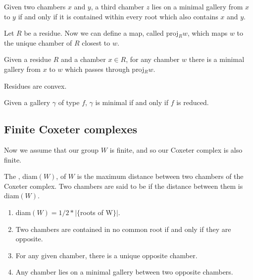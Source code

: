 \documentclass[11pt]{article}
\begin{document}
\begin{proposition}
    Given two chambers $x$ and $y$, a third chamber $z$ lies on a minimal gallery from $x$ to $y$ if and only if it is contained within every root which also contains $x$ and $y$. 
\end{proposition}


Let $R$ be a residue. Now we can define a map, called proj$_Rw$, which maps $w$ to the unique chamber of $R$ closest to $w$. 


\begin{proposition}
    Given a residue $R$ and a chamber $x\in R$, for any chamber $w$ there is a minimal gallery from $x$ to $w$ which passes through proj$_Rw$. 
\end{proposition}

\begin{lemma}
    Residues are convex.
\end{lemma}

\begin{theorem}
    Given a gallery $\gamma$ of type $f$, $\gamma$ is minimal if and only if $f$ is reduced.
\end{theorem}


\subsection{Finite Coxeter complexes}

Now we assume that our group $W$ is finite, and so our Coxeter complex is also finite.

\begin{definition}
    The , diam$(W)$, of $W$ is the maximum distance between two chambers of the Coxeter complex. Two chambers are said to be  if the distance between them is diam$(W)$.
\end{definition}

\begin{theorem}
    \begin{enumerate}
        \item diam$(W) = 1/2\ast |\{${roots of W}$\}|$. 
        \item Two chambers are contained in no common root if and only if they are opposite.
        \item For any given chamber, there is a unique opposite chamber.
        \item Any chamber lies on a minimal gallery between two opposite chambers.
    \end{enumerate}
\end{theorem}
\end{document}
